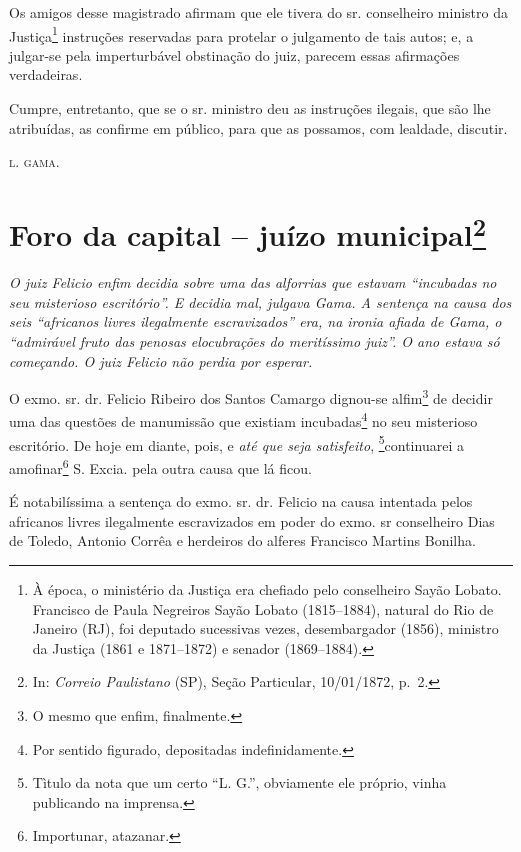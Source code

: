 {Os amigos desse magistrado afirmam que ele tivera do sr. conselheiro
ministro da Justiça\footnote{ À época, o ministério da Justiça era
  chefiado pelo conselheiro Sayão Lobato. Francisco de Paula Negreiros
  Sayão Lobato (1815--1884), natural do Rio de Janeiro (RJ), foi deputado
  sucessivas vezes, desembargador (1856), ministro da Justiça (1861 e
  1871--1872) e senador (1869--1884).} instruções reservadas para protelar
o julgamento de tais autos; e, a julgar-se pela imperturbável obstinação
do juiz, parecem essas afirmações verdadeiras.

Cumpre, entretanto, que se o sr. ministro deu as instruções ilegais, que
são lhe atribuídas, as confirme em público, para que as possamos, com
lealdade, discutir.

\textsc{l. gama}.

\chapter{Foro da capital -- juízo municipal\footnote{ In: \emph{Correio Paulistano} (SP), Seção Particular,
  10/01/1872, p.~2.}} %

\begin{didascalia}
\emph{O juiz Felicio enfim decidia sobre uma das alforrias que estavam
``incubadas no seu misterioso escritório''. E decidia mal, julgava Gama. A
sentença na causa dos seis ``africanos livres ilegalmente escravizados''
era, na ironia afiada de Gama, o ``admirável fruto das penosas
elocubrações do meritíssimo juiz''. O ano estava só começando. O juiz
Felicio não perdia por esperar.}
\end{didascalia}

\asterisc{}

O exmo. sr. dr. Felicio Ribeiro dos Santos Camargo dignou-se
alfim\footnote{ O mesmo que enfim, finalmente.} de decidir uma das
questões de manumissão que existiam incubadas\footnote{ Por sentido
  figurado, depositadas indefinidamente.} no seu misterioso escritório.
De hoje em diante, pois, e \emph{até que seja satisfeito},
\footnote{ Tìtulo da nota que um certo ``L. G.'', obviamente ele próprio,
  vinha publicando na imprensa.}continuarei a amofinar\footnote{
  Importunar, atazanar.} S. Excia. pela outra causa que lá ficou.

É notabilíssima a sentença do exmo. sr. dr. Felicio na causa intentada
pelos africanos livres ilegalmente escravizados em poder do exmo. sr
conselheiro Dias de Toledo, Antonio Corrêa e herdeiros do alferes
Francisco Martins Bonilha.

}
